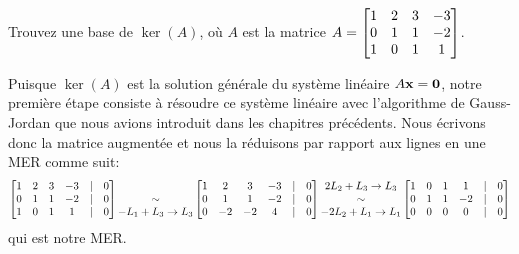 \begin{myprob} \label{exo trouver base de ker} Trouvez une base de $\ker(A)$, o\`u $A$ est la matrice $A = \left[ \begin{matrix} 
1 & 2 & 3 &-3\\ 
0 & 1 & 1 &-2\\ 
1 & 0 & 1 & 1 \end{matrix} \right]$.

\begin{mysol} Puisque $\ker(A)$ est la solution générale du système linéaire $A\mathbf{x}=\mathbf{0}$, notre première étape consiste à résoudre ce système linéaire avec l'algorithme de Gauss-Jordan que nous avions introduit dans les chapitres précédents.  Nous écrivons donc la matrice augmentée et nous la réduisons par rapport aux lignes en une MER comme suit:
$$
\left[ \begin{matrix} 1 & 2 & 3&-3&|&0\\ 0 & 1 & 1&-2&|&0\\ 1 & 0 & 1&1&|&0 \end{matrix} \right]
\begin{matrix} \\\sim \\ -L_1+L_3 \to L_3 \end{matrix}
\left[ \begin{matrix} 
1 & 2 & 3&-3&|&0\\ 
0 & 1 & 1&-2&|&0\\ 
0 & -2 & -2&4&|&0 \end{matrix} \right]
\begin{matrix} 2L_2+L_3 \to L_3 \\ \sim\\ -2L_2+L_1\to L_1 \\  \end{matrix}
\left[ \begin{matrix} 
1 & 0 & 1&1&|&0\\ 
0 & 1 & 1&-2&|&0\\ 
0 & 0 & 0&0&|&0 \end{matrix} \right]
$$
qui est notre MER.


\end{mysol}
\end{myprob}
